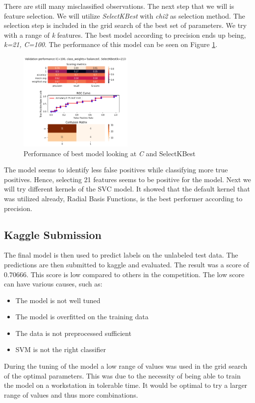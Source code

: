 There are still many misclassified observations. The next step that we will is feature selection. We will utilize \textit{SelectKBest} with \textit{chi2} as selection method. The selection step is included in the grid search of the best set of parameters. We try with a range of \textit{k} features. The best model according to precision ends up being, \textit{k=21, C=100}. The performance of this model can be seen on Figure \ref{fig:results_gridcv_balanced_C_selKBest}.

\begin{figure}[htbp!]
  \centering
  \includegraphics[width=0.5\textwidth]{../project/images/results_gridcv_balanced-C-selectKBest.png}
  \caption{Performance of best model looking at \textit{C} and SelectKBest}
  \label{fig:results_gridcv_balanced_C_selKBest}
\end{figure}

The model seems to identify less false positives while classifying more true positives. Hence, selecting 21 features seems to be positive for the model. Next we will try different kernels of the SVC model. It showed that the default kernel that was utilized already, Radial Basis Functions, is the best performer according to precision.  

\subsection{Kaggle Submission}
The final model is then used to predict labels on the unlabeled test data. The predictions are then submitted to kaggle and evaluated. The result was a score of $0.70666$. This score is low compared to others in the competition. The low score can have various causes, such as:
\begin{itemize}
  \item The model is not well tuned
  \item The model is overfitted on the training data
  \item The data is not preprocessed sufficient
  \item SVM is not the right classifier
\end{itemize}
During the tuning of the model a low range of values was used in the grid search of the optimal parameters. This was due to the necessity of being able to      train the model on a workstation in tolerable time. It would be optimal to try a larger range of values and thus more combinations. 


